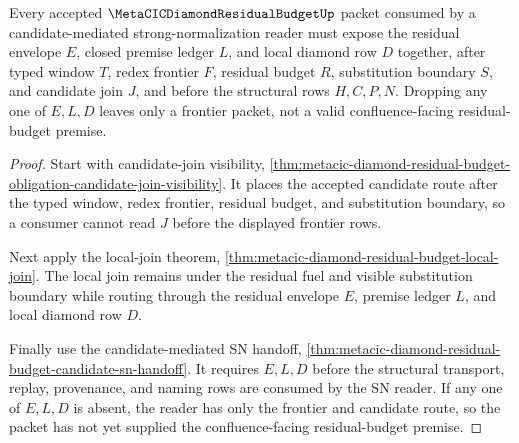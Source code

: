 \begin{theorem}
\label{thm:metacic-diamond-residual-budget-premise-alignment}
Every accepted $\MetaCICDiamondResidualBudgetUp$ packet consumed by a candidate-mediated strong-normalization reader must expose the residual envelope $E$, closed premise ledger $L$, and local diamond row $D$ together, after typed window $T$, redex frontier $F$, residual budget $R$, substitution boundary $S$, and candidate join $J$, and before the structural rows $H,C,P,N$. Dropping any one of $E,L,D$ leaves only a frontier packet, not a valid confluence-facing residual-budget premise.
\end{theorem}
\begin{proof}
Start with candidate-join visibility, \autoref{thm:metacic-diamond-residual-budget-obligation-candidate-join-visibility}. It places the accepted candidate route after the typed window, redex frontier, residual budget, and substitution boundary, so a consumer cannot read $J$ before the displayed frontier rows.

Next apply the local-join theorem, \autoref{thm:metacic-diamond-residual-budget-local-join}. The local join remains under the residual fuel and visible substitution boundary while routing through the residual envelope $E$, premise ledger $L$, and local diamond row $D$.

Finally use the candidate-mediated SN handoff, \autoref{thm:metacic-diamond-residual-budget-candidate-sn-handoff}. It requires $E,L,D$ before the structural transport, replay, provenance, and naming rows are consumed by the SN reader. If any one of $E,L,D$ is absent, the reader has only the frontier and candidate route, so the packet has not yet supplied the confluence-facing residual-budget premise.
\end{proof}

